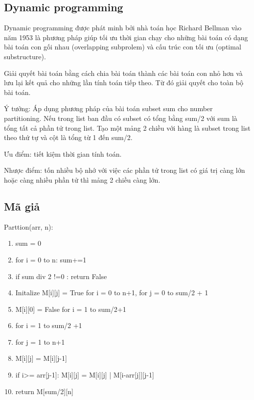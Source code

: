\documentclass[12pt, letterpaper]{article}
\begin{document}
\subsection*{Dynamic programming}
    Dynamic programming được phát minh bởi nhà toán học Richard Bellman vào năm 1953 là phương pháp giúp tối ưu thời gian chạy cho những bài toán có dạng bài toán con gối nhau (overlapping subprolem) và cấu trúc con tối ưu (optimal substructure). 
    
    Giải quyết bài toán bằng cách chia bài toán thành các bài toán con nhỏ hơn và lưu lại kết quả cho những lần tính toán tiếp theo. Từ đó giải quyết cho toàn bộ bài toán. 
    
    Ý tưởng: Áp dụng phương pháp của bài toán subset sum cho number partitioning. Nếu trong list ban đầu có subset có tổng bằng sum/2 với sum là tổng tất cả phần tử trong list. Tạo một mảng 2 chiều  với hàng là subset trong list theo thứ tự và cột là tổng từ 1 đến sum/2. 
    
    Ưu điểm: tiết kiệm thời gian tính toán.
    
    Nhược điểm: tốn nhiều bộ nhớ với việc các phần tử trong list có giá trị càng lớn hoặc càng nhiều phần tử thì mảng 2 chiều càng lớn.
    
\subsection{Mã giả}
Parttion(arr, n):
\begin{enumerate}
    \item sum = 0
    \item for i = 0 to n: sum+=1
    \item if sum div 2 !=0 : return False
    \item Initalize M[i][j] = True for i = 0 to n+1, for j = 0 to sum/2 + 1
    \item M[i][0] = False for i = 1 to sum/2+1 
    \item \setlength{\itemindent}{.5in} for i = 1 to sum/2 +1 
    \item \setlength{\itemindent}{.5in}for j = 1 to n+1
    \item M[i][j] = M[i][j-1]
    \item \setlength{\itemindent}{-.0in} if i>= arr[j-1]:  M[i][j] = M[i][j] | M[i-arr[j]][j-1]
    \item  return M[sum/2][n]
\end{enumerate}
\end{document}
